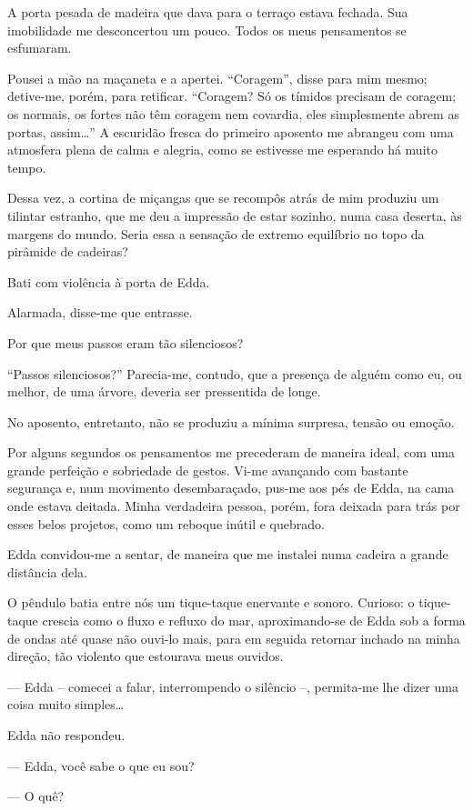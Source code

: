 A porta pesada de madeira que dava para o terraço estava fechada. Sua imobilidade me desconcertou um pouco. Todos os meus pensamentos se esfumaram.

Pousei a mão na maçaneta e a apertei. ``Coragem'', disse para mim mesmo; detive-me, porém, para retificar. ``Coragem? Só os tímidos precisam de coragem; os normais, os fortes não têm coragem nem covardia, eles simplesmente abrem as portas, assim\dots''
A escuridão fresca do primeiro aposento me abrangeu com uma atmosfera plena de calma e alegria, como se estivesse me esperando há muito tempo.

Dessa vez, a cortina de miçangas que se recompôs atrás de mim produziu um tilintar estranho, que me deu a impressão de estar sozinho, numa casa deserta, às margens do mundo. Seria essa a sensação de extremo equilíbrio no topo da pirâmide de cadeiras?

Bati com violência à porta de Edda.

Alarmada, disse-me que entrasse.

Por que meus passos eram tão silenciosos?

``Passos silenciosos?'' Parecia-me, contudo, que a presença de alguém como eu, ou melhor, de uma árvore, deveria ser pressentida de longe.

No aposento, entretanto, não se produziu a mínima surpresa, tensão ou emoção.

Por alguns segundos os pensamentos me precederam de maneira ideal, com uma grande perfeição e sobriedade de gestos. Vi-me avançando com bastante segurança e, num movimento desembaraçado, pus-me aos pés de Edda, na cama onde estava deitada. Minha verdadeira pessoa, porém, fora deixada para trás por esses belos projetos, como um reboque inútil e quebrado.

Edda convidou-me a sentar, de maneira que me instalei numa cadeira a grande distância dela.

O pêndulo batia entre nós um tique-taque enervante e sonoro. Curioso: o tique-taque crescia como o fluxo e refluxo do mar, aproximando-se de Edda sob a forma de ondas até quase não ouvi-lo mais, para em seguida retornar inchado na minha direção, tão violento que estourava meus ouvidos.

--- Edda -- comecei a falar, interrompendo o silêncio --, permita-me lhe dizer uma coisa muito simples\dots

Edda não respondeu.

--- Edda, você sabe o que eu sou?

--- O quê?

